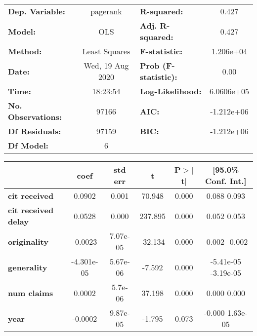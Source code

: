 \begin{center}
\begin{tabular}{lclc}
\toprule
\textbf{Dep. Variable:}     &     pagerank     & \textbf{  R-squared:         } &      0.427    \\
\textbf{Model:}             &       OLS        & \textbf{  Adj. R-squared:    } &      0.427    \\
\textbf{Method:}            &  Least Squares   & \textbf{  F-statistic:       } &  1.206e+04    \\
\textbf{Date:}              & Wed, 19 Aug 2020 & \textbf{  Prob (F-statistic):} &      0.00     \\
\textbf{Time:}              &     18:23:54     & \textbf{  Log-Likelihood:    } &  6.0606e+05   \\
\textbf{No. Observations:}  &       97166      & \textbf{  AIC:               } &  -1.212e+06   \\
\textbf{Df Residuals:}      &       97159      & \textbf{  BIC:               } &  -1.212e+06   \\
\textbf{Df Model:}          &           6      & \textbf{                     } &               \\
\bottomrule
\end{tabular}
\begin{tabular}{lccccc}
                            & \textbf{coef} & \textbf{std err} & \textbf{t} & \textbf{P$>$$|$t$|$} & \textbf{[95.0\% Conf. Int.]}  \\
\midrule
\textbf{cit received}       &       0.0902  &        0.001     &    70.948  &         0.000        &         0.088     0.093       \\
\textbf{cit received delay} &       0.0528  &        0.000     &   237.895  &         0.000        &         0.052     0.053       \\
\textbf{originality}        &      -0.0023  &     7.07e-05     &   -32.134  &         0.000        &        -0.002    -0.002       \\
\textbf{generality}         &   -4.301e-05  &     5.67e-06     &    -7.592  &         0.000        &     -5.41e-05 -3.19e-05       \\
\textbf{num claims}         &       0.0002  &      5.7e-06     &    37.198  &         0.000        &         0.000     0.000       \\
\textbf{year}               &      -0.0002  &     9.87e-05     &    -1.795  &         0.073        &        -0.000  1.63e-05       \\
\bottomrule

\end{tabular}
\end{center}
